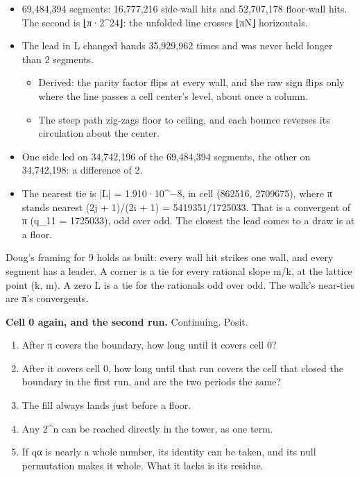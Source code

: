 \begin{itemize}
\item 69,484,394 segments: 16,777,216 side-wall hits and 52,707,178 floor-wall hits. The second is ⌊π·2\textasciicircum{}24⌋: the unfolded line crosses ⌊πN⌋ horizontals.
\item The lead in L changed hands 35,929,962 times and was never held longer than 2 segments.

\begin{itemize}
\item Derived: the parity factor flips at every wall, and the raw sign flips only where the line passes a cell center's level, about once a column.
\item The steep path zig-zags floor to ceiling, and each bounce reverses its circulation about the center.
\end{itemize}
\item One side led on 34,742,196 of the 69,484,394 segments, the other on 34,742,198: a difference of 2.
\item The nearest tie is |L| = 1.910·10\textasciicircum{}−8, in cell (862516, 2709675), where π stands nearest (2j + 1)/(2i + 1) = 5419351/1725033. That is a convergent of π (q\_\allowbreak{}11 = 1725033), odd over odd. The closest the lead comes to a draw is at a floor.
\end{itemize}

Doug's framing for 9 holds as built: every wall hit strikes one wall, and every segment has a leader. A corner is a tie for every rational slope m/k, at the lattice point (k, m). A zero L is a tie for the rationals odd over odd. The walk's near-ties are π's convergents.

\textbf{Cell 0 again, and the second run.} Continuing. Posit.

\begin{enumerate}
\item After π covers the boundary, how long until it covers cell 0?
\item After it covers cell 0, how long until that run covers the cell that closed the boundary in the first run, and are the two periods the same?
\item The fill always lands just before a floor.
\item Any 2\textasciicircum{}n can be reached directly in the tower, as one term.
\item If qα is nearly a whole number, its identity can be taken, and its null permutation makes it whole. What it lacks is its residue.
\end{enumerate}

